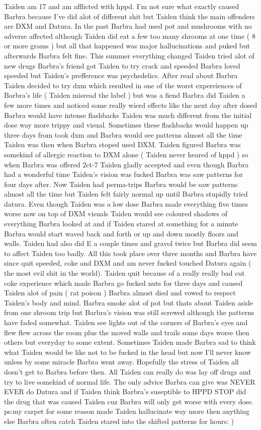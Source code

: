\documentclass[12pt]{book}
\begin{document}
Taiden am 17 and am afflicted with hppd. I'm not sure what exactly caused Barbra because I've did alot of different shit but Taiden think the main offenders are DXM and Datura. In the past Barbra had used pot and mushrooms with no adverse affected although Taiden did eat a few too many shrooms at one time ( 8 or more grams ) but all that happened was major hallucinations and puked but afterwards Barbra felt fine. This summer everything changed Taiden tried alot of new drugs Barbra's friend got Taiden to try crack and speeded Barbra loved speeded but Taiden's prefference was psychedelics. After read about Barbra Taiden decided to try dxm which resulted in one of the worst expereiences of Barbra's life ( Taiden misread the label ) but was a fiend Barbra did Taiden a few more times and noticed some really wierd effects like the next day after dosed Barbra would have intense flashbacks Taiden was much different from the initial dose way more trippy and visual. Sometimes these flashbacks would happen up three days from took dxm and Barbra would see patterns almost all the time Taiden was then when Barbra stoped used DXM. Taiden figured Barbra was somekind of allergic reaction to DXM alone ( Taiden never heared of hppd ) so when Barbra was offered 2ct-7 Taiden gladly accepted and even though Barbra had a wonderful time Taiden's vision was fucked Barbra was saw patterns for four days after. Now Taiden had perma-trips Barbra would be saw patterns almost all the time but Taiden felt fairly normal up until Barbra stupidly tried datura. Even though Taiden was a low dose Barbra made everything five times worse now on top of DXM visuals Taiden would see coloured shadows of everything Barbra looked at and if Taiden stared at something for a minute Barbra would start waved back and forth or up and down mostly floors and walls. Taiden had also did E a couple times and gravol twice but Barbra did seem to affect Taiden too badly. All this took place over three months and Barbra have since quit speeded, coke and DXM and am never fucked touched Datura again ( the most evil shit in the world). Taiden quit because of a really really bad cut coke experience which made Barbra go fucked nuts for three days and caused Taiden alot of pain ( rat poison ) Barbra almost died and vowed to respect Taiden's body and mind. Barbra smoke alot of pot but thats about Taiden aside from one shroom trip but Barbra's vision was still screwed although the patterns have faded somewhat. Taiden see lights out of the corners of Barbra's eyes and flew flew across the room plus the moved walls and trails some days worse then others but everyday to some extent. Sometimes Taiden made Barbra sad to think what Taiden would be like not to be fucked in the head but now I'll never know unless by some miracle Barbra went away. Hopefully the stress of Taiden all dosn't get to Barbra before then. All Taiden can really do was lay off drugs and try to live somekind of normal life. The only advice Barbra can give was NEVER EVER do Datura and if Taiden think Barbra's suseptible to HPPD STOP did the drug that was caused Taiden cuz Barbra will only get worse with every dose. ps:my carpet for some reason made Taiden hallucinate way more then anything else Barbra often catch Taiden stared into the shifted patterns for hours: )
\end{document}

